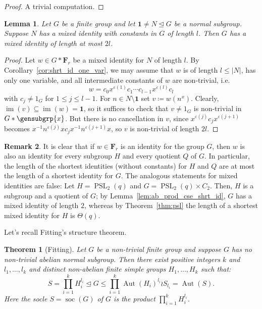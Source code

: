 \documentclass[a4paper,11pt]{amsproc}
\newcommand{\card}[1]{\left\lvert#1\right\rvert}%
\newcommand{\trivgrp}{\mathbf{1}}%
\DeclareMathOperator{\Aut}{Aut}%
\newcommand{\freegrp}{\mathbf F}%
\DeclareMathOperator{\PSL}{PSL}%
\DeclareMathOperator{\im}{im}%
\DeclareMathOperator{\soc}{soc}%
\theoremstyle{plain}
\newtheorem{theorem}{Theorem}
\newtheorem{lemma}{Lemma}[section]
\theoremstyle{definition}
\newtheorem{remark}[lemma]{Remark}
\begin{document}
	\begin{proof}
		A trivial computation.
	\end{proof}
	
	\begin{lemma}\label{lem:nor_subgrp}
		Let $G$ be a finite group and let $\trivgrp\neq N\trianglelefteq G$ be a normal subgroup. Suppose $N$ has a mixed identity with constants in $G$ of length $l$. Then $G$ has a mixed identity of length at most $2l$. 
	\end{lemma}
	
	\begin{proof}
		Let $w\in G\ast\freegrp_r$ be a mixed identity for $N$ of length $l$. By Corollary~\ref{cor:shrt_id_one_var}, we may assume that $w$ is of length $l\leq\card{N}$, has only one variable, and all intermediate constants of $w$ are non-trivial, i.e.\ 
		$$
		w=c_0 x^{\varepsilon(1)} c_1\cdots c_{l-1} x^{\varepsilon(l)} c_l
		$$ 
		with $c_j\neq1_G$ for $1\leq j\leq l-1$. For $n\in N\setminus\trivgrp$ set $v\coloneqq w(n^x)$. Clearly, $\im(v)\subseteq\im(w)=\trivgrp$, so it suffices to check that $v\neq 1_G$ is non-trivial in $G\ast\gensubgrp{x}$. But there is no cancellation in $v$, since $x^{\varepsilon(j)} c_j x^{\varepsilon(j+1)}$ becomes $x^{-1} n^{\varepsilon(j)}x c_j x^{-1} n^{\varepsilon(j+1)}x$, so $v$ is non-trivial of length $2l$.
	\end{proof}
	
	\begin{remark}
		It is clear that if $w\in\freegrp_r$ is an identity for the group $G$, then $w$ is also an identity for every subgroup $H$ and every quotient $Q$ of $G$. In particular, the length of the shortest identities (without constants) for $H$ and $Q$ are at most the length of a shortest identity for $G$. The analogous statements for mixed identities are false: Let $H=\PSL_2(q)$ and $G=\PSL_2(q)\times C_2$. Then, $H$ is a subgroup and a quotient of $G$; by Lemma~\ref{lem:ab_prod_cse_shrt_id}, $G$ has a mixed identity of length $2$, whereas by Theorem~\ref{thm:psl} the length of a shortest mixed identity for $H$ is $\Theta(q)$. 
	\end{remark}
	
	Let's recall Fitting's structure theorem.
	
	\begin{theorem}[Fitting]\label{thm:fitting}
		Let $G$ be a non-trivial finite group and suppose $G$ has no non-trivial abelian normal subgroup. Then there exist positive integers $k$ and $l_1,\ldots,l_k$ and distinct non-abelian finite simple groups $H_1,\ldots,H_k$ such that: 
		$$
		S=\prod_{i=1}^k H_i ^{l_i}\trianglelefteq G\leq\prod_{i=1}^k \Aut(H_i)^{l_i}\wr S_{l_i}=\Aut(S)\text{.}
		$$
		Here the socle $S=\soc(G)$ of $G$ is the product $\prod_{i=1}^k H_i^{l_i}$.
	\end{theorem}
	
\end{document}

